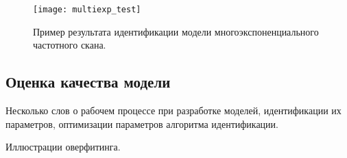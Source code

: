     \begin{figure}[!ht]
        \centering
        \texttt{[image: multiexp\_test]}
        \caption{Пример результата идентификации модели многоэкспоненциального
        частотного скана.}
        \label{pic:multiexp_test}
    \end{figure}


    \subsection{Оценка качества модели}
    Несколько слов о рабочем процессе при разработке моделей, идентификации
    их параметров, оптимизации параметров алгоритма идентификации.

    Иллюстрации оверфитинга.